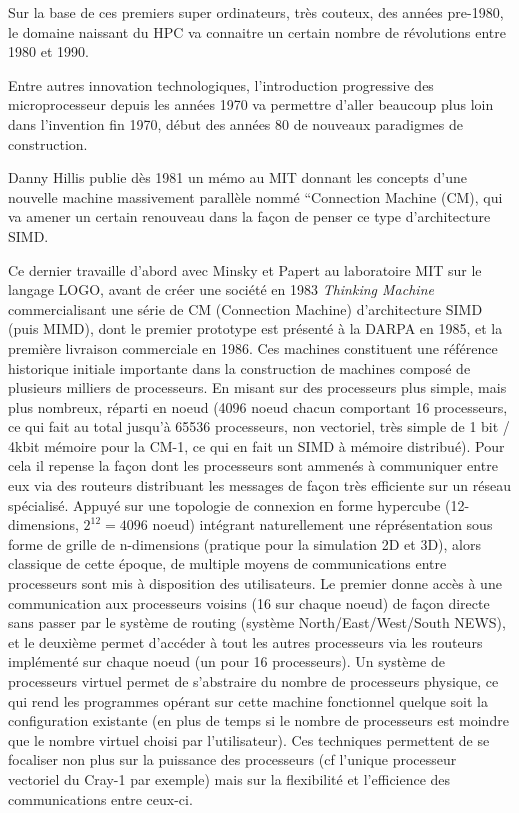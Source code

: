 
Sur la base de ces premiers super ordinateurs, très couteux, des années pre-1980, le domaine naissant du HPC va connaitre un certain nombre de révolutions entre 1980 et 1990. 

Entre autres innovation technologiques, l'introduction progressive des microprocesseur depuis les années 1970 va permettre d'aller beaucoup plus loin dans l'invention fin 1970, début des années 80 de nouveaux paradigmes de construction. %

Danny Hillis publie dès 1981 un mémo au MIT donnant les concepts d'une nouvelle machine massivement parallèle nommé “Connection Machine (CM), qui va amener un certain renouveau dans la façon de penser ce type d'architecture SIMD. 

Ce dernier travaille d'abord avec Minsky et Papert au laboratoire MIT sur le langage LOGO, avant de créer une société en 1983 \textit{Thinking Machine} commercialisant une série de CM (Connection Machine) d’architecture SIMD (puis MIMD), dont le premier prototype est présenté à la DARPA en 1985, et la première livraison commerciale en 1986. Ces machines constituent une référence historique initiale importante dans la construction de machines composé de plusieurs milliers de processeurs. En misant sur des processeurs plus simple, mais plus nombreux, réparti en noeud (4096 noeud chacun comportant 16 processeurs, ce qui fait au total jusqu'à 65536 processeurs, non vectoriel, très simple de 1 bit / 4kbit mémoire pour la CM-1, ce qui en fait un SIMD à mémoire distribué). Pour cela il repense la façon dont les processeurs sont ammenés à communiquer entre eux via des routeurs distribuant les messages de façon très efficiente sur un réseau spécialisé. Appuyé sur une topologie de connexion en forme hypercube (12-dimensions, $2^12 = 4096$ noeud) intégrant naturellement une réprésentation sous forme de grille de n-dimensions (pratique pour la simulation 2D et 3D), alors classique de cette époque, de multiple moyens de communications entre processeurs sont mis à disposition des utilisateurs. Le premier donne accès à une communication aux processeurs voisins (16 sur chaque noeud) de façon directe sans passer par le système de routing (système North/East/West/South NEWS), et le deuxième permet d'accéder à tout les autres processeurs via les routeurs implémenté sur chaque noeud (un pour 16 processeurs). Un système de processeurs virtuel permet de s'abstraire du nombre de processeurs physique, ce qui rend les programmes opérant sur cette machine fonctionnel quelque soit la configuration existante (en plus de temps si le nombre de processeurs est moindre que le nombre virtuel choisi par l'utilisateur). Ces techniques permettent de se focaliser non plus sur la puissance des processeurs (cf l'unique processeur vectoriel du Cray-1 par exemple) mais sur la flexibilité et l'efficience des communications entre ceux-ci.

